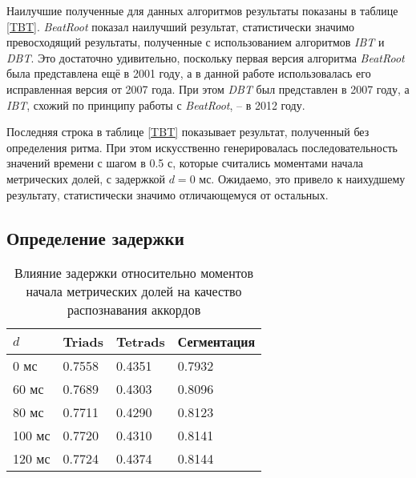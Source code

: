 Наилучшие полученные для данных алгоритмов результаты показаны в таблице
\ref{TBT}. \emph{BeatRoot} показал наилучший результат, статистически значимо
превосходящий результаты, полученные с использованием алгоритмов \emph{IBT} и
\emph{DBT}. Это достаточно удивительно, поскольку первая версия алгоритма
\emph{BeatRoot} была представлена ещё в 2001 году, а в данной работе
использовалась его исправленная версия от 2007 года. При этом \emph{DBT} был
представлен в 2007 году, а \emph{IBT}, схожий по принципу работы с
\emph{BeatRoot}, -- в 2012 году. 

Последняя строка в таблице \ref{TBT} показывает результат, полученный без
определения ритма. При этом искусственно генерировалась последовательность
значений времени с шагом в 0.5 с, которые считались моментами начала метрических
долей, с задержкой $d=0$ мс. Ожидаемо, это привело к наихудшему результату,
статистически значимо отличающемуся от остальных.

\subsection{Определение задержки} \label{ssec3_offset}

\begin{table} [htbp]
  \centering
  \parbox{15cm}{\caption{Влияние задержки относительно моментов начала
  метрических долей на качество распознавания аккордов} \label{TTunFreq}}
  \begin{tabular}{|l|l|l|l|}
  \hline
  $d$ & Triads & Tetrads & Сегментация \\
  \hline
  0 мс & 0.7558 & 0.4351 & 0.7932 \\
  60 мс & 0.7689 & 0.4303 & 0.8096 \\
  80 мс & 0.7711 & 0.4290 & 0.8123 \\
  100 мс & 0.7720 & 0.4310 & 0.8141 \\
  120 мс & 0.7724 & 0.4374 & 0.8144 \\
  \hline
  \end{tabular}
\end{table}

